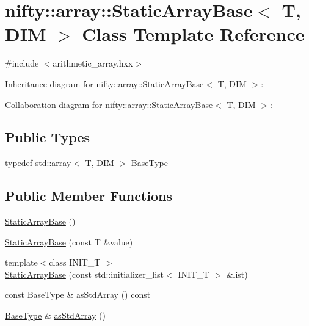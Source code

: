 \hypertarget{classnifty_1_1array_1_1StaticArrayBase}{}\section{nifty\+:\+:array\+:\+:Static\+Array\+Base$<$ T, D\+I\+M $>$ Class Template Reference}
\label{classnifty_1_1array_1_1StaticArrayBase}


{\ttfamily \#include $<$arithmetic\+\_\+array.\+hxx$>$}



Inheritance diagram for nifty\+:\+:array\+:\+:Static\+Array\+Base$<$ T, D\+I\+M $>$\+:


Collaboration diagram for nifty\+:\+:array\+:\+:Static\+Array\+Base$<$ T, D\+I\+M $>$\+:
\subsection*{Public Types}
\begin{DoxyCompactItemize}
\item 
typedef std\+::array$<$ T, D\+I\+M $>$ \hyperlink{classnifty_1_1array_1_1StaticArrayBase_a3f376d2a24fad3a47021c36657494759}{Base\+Type}
\end{DoxyCompactItemize}
\subsection*{Public Member Functions}
\begin{DoxyCompactItemize}
\item 
\hyperlink{classnifty_1_1array_1_1StaticArrayBase_ab15a9b2d0259a54795ffc5aac8d62e50}{Static\+Array\+Base} ()
\item 
\hyperlink{classnifty_1_1array_1_1StaticArrayBase_aa798253fef388d6c0d0fd3d436784e79}{Static\+Array\+Base} (const T \&value)
\item 
{\footnotesize template$<$class I\+N\+I\+T\+\_\+\+T $>$ }\\\hyperlink{classnifty_1_1array_1_1StaticArrayBase_a6d8d83f91ab1ba26d94d9a5915f98bb0}{Static\+Array\+Base} (const std\+::initializer\+\_\+list$<$ I\+N\+I\+T\+\_\+\+T $>$ \&list)
\item 
const \hyperlink{classnifty_1_1array_1_1StaticArrayBase_a3f376d2a24fad3a47021c36657494759}{Base\+Type} \& \hyperlink{classnifty_1_1array_1_1StaticArrayBase_ad4a33e73ab03d344489c81af7108773d}{as\+Std\+Array} () const 
\item 
\hyperlink{classnifty_1_1array_1_1StaticArrayBase_a3f376d2a24fad3a47021c36657494759}{Base\+Type} \& \hyperlink{classnifty_1_1array_1_1StaticArrayBase_a205328f2e3ad922e007afe0f9f3e819b}{as\+Std\+Array} ()
\end{DoxyCompactItemize}


